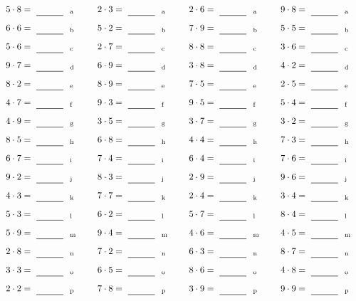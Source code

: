 \documentclass
[
  draft    = true,
  fontsize = 11pt,
  parskip  = half-
]
{scrartcl}
\begin{document}
\par\vfill\par
\begin{align*}
    \pline{5\cdot8}&=\rline{a}
  & \pline{2\cdot3}&=\rline{a}
  & \pline{2\cdot6}&=\rline{a}
  & \pline{9\cdot8}&=\rline{a} \\[1ex]
    \pline{6\cdot6}&=\rline{b}
  & \pline{5\cdot2}&=\rline{b}
  & \pline{7\cdot9}&=\rline{b}
  & \pline{5\cdot5}&=\rline{b} \\[1ex]
    \pline{5\cdot6}&=\rline{c}
  & \pline{2\cdot7}&=\rline{c}
  & \pline{8\cdot8}&=\rline{c}
  & \pline{3\cdot6}&=\rline{c} \\[1ex]
    \pline{9\cdot7}&=\rline{d}
  & \pline{6\cdot9}&=\rline{d}
  & \pline{3\cdot8}&=\rline{d}
  & \pline{4\cdot2}&=\rline{d} \\[1ex]
    \pline{8\cdot2}&=\rline{e}
  & \pline{8\cdot9}&=\rline{e}
  & \pline{7\cdot5}&=\rline{e}
  & \pline{2\cdot5}&=\rline{e} \\[1ex]
    \pline{4\cdot7}&=\rline{f}
  & \pline{9\cdot3}&=\rline{f}
  & \pline{9\cdot5}&=\rline{f}
  & \pline{5\cdot4}&=\rline{f} \\[1ex]
    \pline{4\cdot9}&=\rline{g}
  & \pline{3\cdot5}&=\rline{g}
  & \pline{3\cdot7}&=\rline{g}
  & \pline{3\cdot2}&=\rline{g} \\[1ex]
    \pline{8\cdot5}&=\rline{h}
  & \pline{6\cdot8}&=\rline{h}
  & \pline{4\cdot4}&=\rline{h}
  & \pline{7\cdot3}&=\rline{h} \\[1ex]
    \pline{6\cdot7}&=\rline{i}
  & \pline{7\cdot4}&=\rline{i}
  & \pline{6\cdot4}&=\rline{i}
  & \pline{7\cdot6}&=\rline{i} \\[1ex]
    \pline{9\cdot2}&=\rline{j}
  & \pline{8\cdot3}&=\rline{j}
  & \pline{2\cdot9}&=\rline{j}
  & \pline{9\cdot6}&=\rline{j} \\[1ex]
    \pline{4\cdot3}&=\rline{k}
  & \pline{7\cdot7}&=\rline{k}
  & \pline{2\cdot4}&=\rline{k}
  & \pline{3\cdot4}&=\rline{k} \\[1ex]
    \pline{5\cdot3}&=\rline{l}
  & \pline{6\cdot2}&=\rline{l}
  & \pline{5\cdot7}&=\rline{l}
  & \pline{8\cdot4}&=\rline{l} \\[1ex]
    \pline{5\cdot9}&=\rline{m}
  & \pline{9\cdot4}&=\rline{m}
  & \pline{4\cdot6}&=\rline{m}
  & \pline{4\cdot5}&=\rline{m} \\[1ex]
    \pline{2\cdot8}&=\rline{n}
  & \pline{7\cdot2}&=\rline{n}
  & \pline{6\cdot3}&=\rline{n}
  & \pline{8\cdot7}&=\rline{n} \\[1ex]
    \pline{3\cdot3}&=\rline{o}
  & \pline{6\cdot5}&=\rline{o}
  & \pline{8\cdot6}&=\rline{o}
  & \pline{4\cdot8}&=\rline{o} \\[1ex]
    \pline{2\cdot2}&=\rline{p}
  & \pline{7\cdot8}&=\rline{p}
  & \pline{3\cdot9}&=\rline{p}
  & \pline{9\cdot9}&=\rline{p}
\end{align*}
\end{document}
